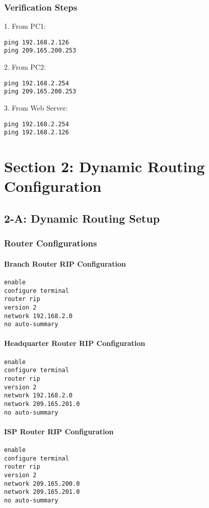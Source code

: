 \documentclass[12pt]{article}
\begin{document}
\subsubsection{Verification Steps}
1. From PC1:
\begin{lstlisting}[frame=single]
ping 192.168.2.126
ping 209.165.200.253
\end{lstlisting}

2. From PC2:
\begin{lstlisting}[frame=single]
ping 192.168.2.254
ping 209.165.200.253
\end{lstlisting}

3. From Web Server:
\begin{lstlisting}[frame=single]
ping 192.168.2.254
ping 192.168.2.126
\end{lstlisting}

\section{Section 2: Dynamic Routing Configuration}

\subsection{2-A: Dynamic Routing Setup}
\subsubsection{Router Configurations}

\paragraph{Branch Router RIP Configuration}
\begin{lstlisting}[frame=single]
enable
configure terminal
router rip
version 2
network 192.168.2.0
no auto-summary
\end{lstlisting}

\paragraph{Headquarter Router RIP Configuration}
\begin{lstlisting}[frame=single]
enable
configure terminal
router rip
version 2
network 192.168.2.0
network 209.165.201.0
no auto-summary
\end{lstlisting}

\paragraph{ISP Router RIP Configuration}
\begin{lstlisting}[frame=single]
enable
configure terminal
router rip
version 2
network 209.165.200.0
network 209.165.201.0
no auto-summary
\end{lstlisting}
\end{document}
